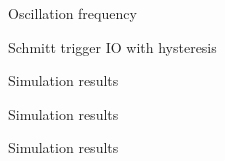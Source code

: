 \documentclass[12pt, aspectratio=169]{beamer}
\begin{document}
\begin{frame}{Oscillation frequency}
\end{frame}

\begin{frame}{Schmitt trigger IO with hysteresis}
\end{frame}

\begin{frame}{Simulation results}
\end{frame}

\begin{frame}{Simulation results}
\end{frame}

\begin{frame}{Simulation results}
\end{frame}
\end{document}
